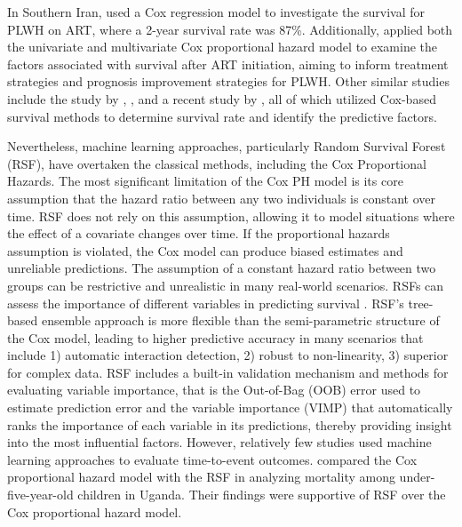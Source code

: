 \documentclass[10pt]{NSP1}
\begin{document}
 In Southern Iran, \cite{Afrashteh2023} used a Cox regression model to investigate the survival for PLWH on ART, where a 2-year survival rate was 87\%. Additionally, \cite{Pu2024} applied both the univariate and multivariate Cox proportional hazard model to examine the factors associated with survival after ART initiation, aiming to inform treatment strategies and prognosis improvement strategies for PLWH. Other similar studies include the study by \cite{Nigussie2020}, \cite{Nura2024}, and a recent study by \cite{Shaik2025}, all of which utilized Cox-based survival methods to determine survival rate and identify the predictive factors. 
 
Nevertheless, machine learning approaches, particularly Random Survival Forest (RSF), have overtaken the classical methods, including the Cox Proportional Hazards. The most significant limitation of the Cox PH model is its core assumption that the hazard ratio between any two individuals is constant over time. RSF does not rely on this assumption, allowing it to model situations where the effect of a covariate changes over time. If the proportional hazards assumption is violated, the Cox model can produce biased estimates and unreliable predictions. The assumption of a constant hazard ratio between two groups can be restrictive and unrealistic in many real-world scenarios. RSFs can assess the importance of different variables in predicting survival \cite{Breiman2003}. RSF's tree-based ensemble approach is more flexible than the semi-parametric structure of the Cox model, leading to higher predictive accuracy in many scenarios that include 1) automatic interaction detection, 2) robust to non-linearity, 3) superior for complex data. RSF includes a built-in validation mechanism and methods for evaluating variable importance, that is the Out-of-Bag (OOB) error used to estimate prediction error and the variable importance (VIMP) that automatically ranks the importance of each variable in its predictions, thereby providing insight into the most influential factors. However, relatively few studies used machine learning approaches to evaluate time-to-event outcomes. \cite{Nasejje2017} compared the Cox proportional hazard model with the RSF in analyzing mortality among under-five-year-old children in Uganda. Their findings were supportive of RSF over the Cox proportional hazard model. 
\end{document}
